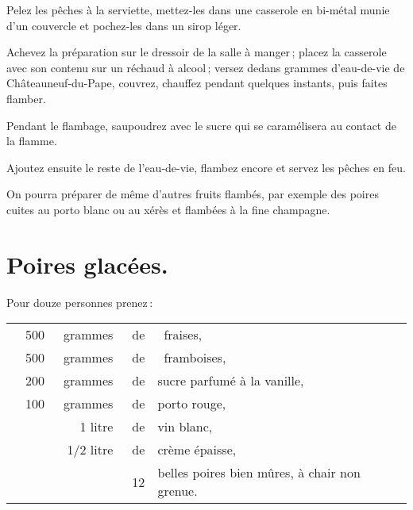 Pelez les pêches à la serviette, mettez-les dans une casserole en bi-métal
munie d'un couvercle et pochez-les dans un sirop léger.

Achevez la préparation sur le dressoir de la salle à manger ; placez la
casserole avec son contenu sur un réchaud à alcool ; versez dedans
{\mmm} grammes d'eau-de-vie de Châteauneuf-du-Pape, couvrez, chauffez
pendant quelques instants, puis faites flamber.

Pendant le flambage, saupoudrez avec le sucre qui se caramélisera au contact de
la flamme.

Ajoutez ensuite le reste de l’eau-de-vie, flambez encore et servez les pêches en feu.

\sk

On pourra préparer de même d'autres fruits flambés, par exemple des poires
cuites au porto blanc ou au xérès et flambées à la fine champagne.

\section*{\centering Poires glacées.}
{}

Pour douze personnes prenez :

\footnotesize
\begin{longtable}{rrrrp{16em}}
  & 500 & grammes & de & fraises,                                                                         \\
  & 500 & grammes & de & framboises,                                                                      \\
  & 200 & grammes & de & sucre parfumé à la vanille,                                                      \\
  & 100 & grammes & de & porto rouge,                                                                     \\
  &     & 1 litre & de & vin blanc,                                                                       \\
  & \multicolumn{2}{r}{1/2 litre} & de & crème épaisse,                                                   \\
  &     &         & 12 & belles poires bien mûres, à chair non grenue.                                    \\
\end{longtable}
\normalsize

